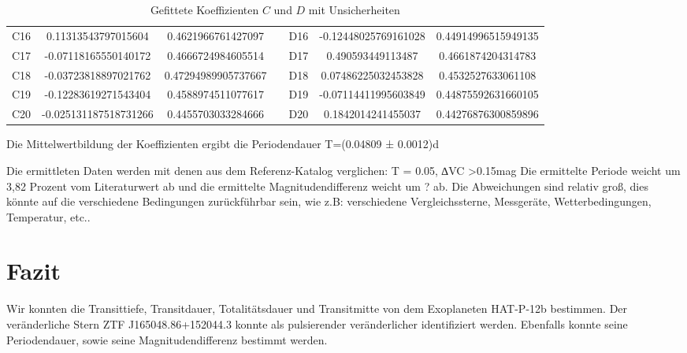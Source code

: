 \documentclass[ngerman,ruledheaders=section,class=report,thesis={type=Protokoll},accentcolor=1b,marginpar=false,parskip=half-,fontsize=11pt,]{tudapub}
\begin{document}
\begin{table}[ht]
\begin{tabular}{lccclcc}
        C16 & 0.11313543797015604 & 0.4621966761427097 & & D16 & -0.12448025769161028 & 0.44914996515949135 \\
        C17 & -0.07118165550140172 & 0.4666724984605514 & & D17 & 0.490593449113487 & 0.4661874204314783 \\
        C18 & -0.03723818897021762 & 0.47294989905737667 & & D18 & 0.07486225032453828 & 0.4532527633061108 \\
        C19 & -0.12283619271543404 & 0.4588974511077617 & & D19 & -0.07114411995603849 & 0.44875592631660105 \\
        C20 & -0.025131187518731266 & 0.4455703033284666 & & D20 & 0.1842014241455037 & 0.44276876300859896 \\
        \bottomrule
    \end{tabular}
    \caption{Gefittete Koeffizienten \( C \) und \( D \) mit Unsicherheiten}
    \label{tab:gefittete_koeffizienten_cd}
\end{table}

Die Mittelwertbildung der Koeffizienten ergibt die Periodendauer T=(0.04809 ± 0.0012)d

Die ermittleten Daten werden mit denen aus dem Referenz-Katalog verglichen: T = 0.05, ∆VC >0.15mag
 Die ermittelte Periode weicht um 3,82 Prozent vom Literaturwert ab und die ermittelte
 Magnitudendifferenz weicht um ? ab. Die Abweichungen sind relativ groß, dies könnte auf die verschiedene Bedingungen zurückführbar sein, wie z.B: verschiedene Vergleichssterne, Messgeräte, Wetterbedingungen, Temperatur, etc..


	\chapter{Fazit}
	Wir konnten die Transittiefe, Transitdauer, Totalitätsdauer und Transitmitte von dem Exoplaneten HAT-P-12b bestimmen.
Der veränderliche Stern ZTF J165048.86+152044.3 konnte als pulsierender veränderlicher identifiziert werden. Ebenfalls konnte seine Periodendauer, sowie seine Magnitudendifferenz bestimmt werden.

	
	
	\printbibliography
	
	
\end{document}
